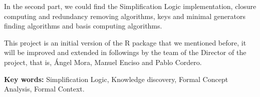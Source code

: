 In the second part, we could find the Simplification 
Logic implementation, closure computing and redundancy removing algorithms, keys and minimal generators 
finding algorithms and basis computing algorithms. 

This project is an initial version of the R package 
that we mentioned before, it will be improved and extended in followings by the team of the Director of 
the project, that is, \'Angel Mora, Manuel Enciso and Pablo Cordero.

\bigskip

\textbf{Key words:} Simplification Logic,  Knowledge discovery, 
Formal Concept Analysis, Formal Context.

